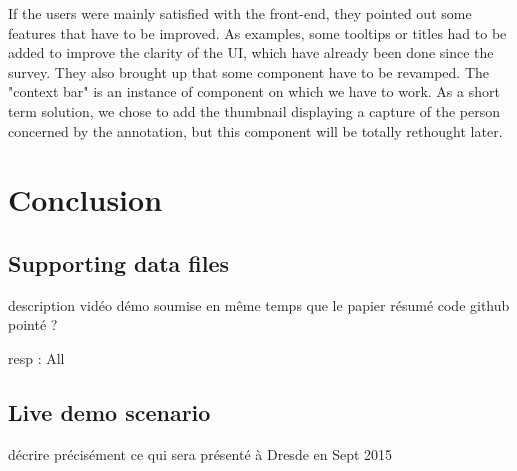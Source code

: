 \documentclass[a4paper]{article}
\begin{document}
If the users were mainly satisfied with the front-end, they pointed out some features that have to be improved. As examples, some tooltips or titles had to be added to improve the clarity of the UI, which have already been done since the survey. They also brought up that some component have to be revamped. The "context bar" is an instance of component on which we have to work. As a short term solution, we chose to add the thumbnail displaying a capture of the person concerned by the annotation, but this component will be totally rethought later.




  \section{Conclusion}
  
    \subsection{Supporting data files}

description vidéo démo soumise en même temps que le papier
résumé code github pointé ?    

resp : All

    \subsection{Live demo scenario}

décrire précisément ce qui sera présenté à Dresde en Sept 2015

  
  \eightpt
  
  
  
\end{document}
